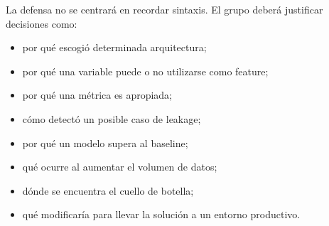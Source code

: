 \documentclass[11pt,a4paper]{article}
\begin{document}
La defensa no se centrará en recordar sintaxis. El grupo deberá justificar decisiones como:

\begin{itemize}
  \item por qué escogió determinada arquitectura;
  \item por qué una variable puede o no utilizarse como feature;
  \item por qué una métrica es apropiada;
  \item cómo detectó un posible caso de leakage;
  \item por qué un modelo supera al baseline;
  \item qué ocurre al aumentar el volumen de datos;
  \item dónde se encuentra el cuello de botella;
  \item qué modificaría para llevar la solución a un entorno productivo.
\end{itemize}
\end{document}
